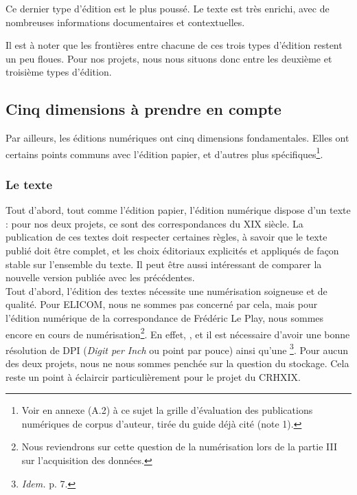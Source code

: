 Ce dernier type d'édition est le plus poussé. Le texte est très enrichi, avec de nombreuses informations documentaires et contextuelles.

Il est à noter que les frontières entre chacune de ces trois types d'édition restent un peu floues. Pour nos projets, nous nous situons donc entre les deuxième et troisième types d'édition.

\subsection{Cinq dimensions à prendre en compte}

Par ailleurs, les éditions numériques ont cinq dimensions fondamentales. Elles ont certains points communs avec l'édition papier, et d'autres plus spécifiques\footnote{Voir en annexe (A.2) à ce sujet la grille d'évaluation des publications numériques de corpus d'auteur, tirée du guide déjà cité (note 1). }.

\subsubsection{Le texte}
Tout d'abord, tout comme l'édition papier, l'édition numérique dispose d'un texte : pour nos deux projets, ce sont des correspondances du XIX siècle. 
La publication de ces textes doit respecter certaines règles, à savoir que le texte publié doit être complet, et les choix éditoriaux explicités et appliqués de façon stable sur l'ensemble du texte. Il peut être aussi intéressant de comparer la nouvelle version publiée avec les précédentes. \\

Tout d'abord, l'édition des textes nécessite une numérisation soigneuse et de qualité. Pour ELICOM, nous ne sommes pas concerné par cela, mais pour l'édition numérique de la correspondance de Frédéric Le Play, nous sommes encore en cours de numérisation\footnote{Nous reviendrons sur cette question de la numérisation lors de la partie III sur l'acquisition des données.}. En effet, , et il est nécessaire d'avoir une bonne résolution de DPI (\emph{Digit per Inch} ou point par pouce) ainsi qu'une \footnote{\emph{Idem.} p. 7.}. Pour aucun des deux projets, nous ne nous sommes penchée sur la question du stockage. Cela reste un point à éclaircir particulièrement pour le projet du CRHXIX. 

